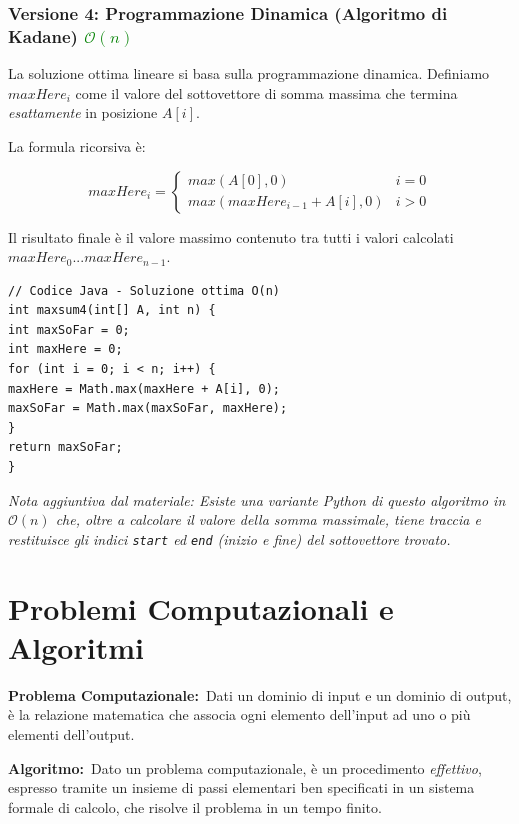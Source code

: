 \documentclass[12pt, a4paper]{article}
\begin{document}
\subsubsection{Versione 4: Programmazione Dinamica (Algoritmo di Kadane) \textcolor{green}{$\mathcal{O}(n)$}}
La soluzione ottima lineare si basa sulla programmazione dinamica. Definiamo $maxHere_i$ come il valore del sottovettore di somma massima che termina \textit{esattamente} in posizione $A[i]$.

La formula ricorsiva è:


$$maxHere_i = \begin{cases} max(A[0], 0) & i = 0 \\ max(maxHere_{i-1} + A[i], 0) & i > 0 \end{cases}$$

Il risultato finale è il valore massimo contenuto tra tutti i valori calcolati $maxHere_0 ... maxHere_{n-1}$.

\begin{verbatim}
// Codice Java - Soluzione ottima O(n)
int maxsum4(int[] A, int n) {
int maxSoFar = 0;
int maxHere = 0;
for (int i = 0; i < n; i++) {
maxHere = Math.max(maxHere + A[i], 0);
maxSoFar = Math.max(maxSoFar, maxHere);
}
return maxSoFar;
}
\end{verbatim}
\textit{Nota aggiuntiva dal materiale: Esiste una variante Python di questo algoritmo in $\mathcal{O}(n)$ che, oltre a calcolare il valore della somma massimale, tiene traccia e restituisce gli indici \texttt{start} ed \texttt{end} (inizio e fine) del sottovettore trovato.}



\section{Problemi Computazionali e Algoritmi}

\begin{tcolorbox}[colback=lightergray!10, colframe=tocsec, title=\textbf{Definizioni Fondamentali}]
\textbf{Problema Computazionale:}\
Dati un dominio di input e un dominio di output, è la relazione matematica che associa ogni elemento dell'input ad uno o più elementi dell'output.

\textbf{Algoritmo:}\
Dato un problema computazionale, è un procedimento \textit{effettivo}, espresso tramite un insieme di passi elementari ben specificati in un sistema formale di calcolo, che risolve il problema in un tempo finito.
\end{tcolorbox}
\end{document}
